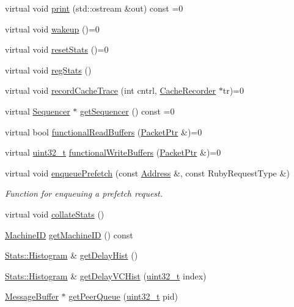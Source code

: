 \begin{DoxyCompactItemize}
\item 
virtual void \hyperlink{classAbstractController_a3ea5f7af5db62cc24f4e40df9ea5c971}{print} (std::ostream \&out) const =0
\item 
virtual void \hyperlink{classAbstractController_a623e3e7d1b1c725d70009f7b01a421b9}{wakeup} ()=0
\item 
virtual void \hyperlink{classAbstractController_a9820f96c5343e42ad3fcbc97b83f59d5}{resetStats} ()=0
\item 
virtual void \hyperlink{classAbstractController_a4dc637449366fcdfc4e764cdf12d9b11}{regStats} ()
\item 
virtual void \hyperlink{classAbstractController_a4ca8c1956ef762ec2219ff377a68c7ba}{recordCacheTrace} (int cntrl, \hyperlink{classCacheRecorder}{CacheRecorder} $\ast$tr)=0
\item 
virtual \hyperlink{classSequencer}{Sequencer} $\ast$ \hyperlink{classAbstractController_ada806654b26aababb417afe9bfbf66e5}{getSequencer} () const =0
\item 
virtual bool \hyperlink{classAbstractController_ab4c57c1f46545be8cb011b32d4949330}{functionalReadBuffers} (\hyperlink{classPacket}{PacketPtr} \&)=0
\item 
virtual \hyperlink{Type_8hh_a435d1572bf3f880d55459d9805097f62}{uint32\_\-t} \hyperlink{classAbstractController_a87a5fc3e2b5c5e1813ed7ed3ef1689ae}{functionalWriteBuffers} (\hyperlink{classPacket}{PacketPtr} \&)=0
\item 
virtual void \hyperlink{classAbstractController_a4498badc3fa7137b6d66736d302623ae}{enqueuePrefetch} (const \hyperlink{classAddress}{Address} \&, const RubyRequestType \&)
\begin{DoxyCompactList}\small\item\em Function for enqueuing a prefetch request. \item\end{DoxyCompactList}\item 
virtual void \hyperlink{classAbstractController_ae3089fd60541650eefd9605c2c1abc68}{collateStats} ()
\item 
\hyperlink{structMachineID}{MachineID} \hyperlink{classAbstractController_abaec6aa0c0c0f1d34472f0b3702d86c4}{getMachineID} () const 
\item 
\hyperlink{classStats_1_1Histogram}{Stats::Histogram} \& \hyperlink{classAbstractController_a8c0950c725a8898f340f7b267ff208be}{getDelayHist} ()
\item 
\hyperlink{classStats_1_1Histogram}{Stats::Histogram} \& \hyperlink{classAbstractController_a2fc801bc03037a99f6689b7d1bb4eda9}{getDelayVCHist} (\hyperlink{Type_8hh_a435d1572bf3f880d55459d9805097f62}{uint32\_\-t} index)
\item 
\hyperlink{classMessageBuffer}{MessageBuffer} $\ast$ \hyperlink{classAbstractController_a3a55ba724e099baf8906b6ba1a943b52}{getPeerQueue} (\hyperlink{Type_8hh_a435d1572bf3f880d55459d9805097f62}{uint32\_\-t} pid)
\end{DoxyCompactItemize}
